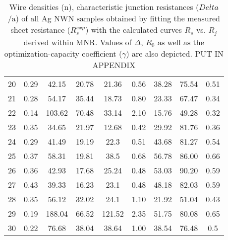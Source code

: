 \begin{table}
\begin{center}
\begin{tabular}{| c | c c c c c c c c |}
20 & 0.29 & 42.15 & 20.78 & 21.36 & 0.56 & 38.28 & 75.54 & 0.51 \\ 
21 & 0.28 & 54.17 & 35.44 & 18.73 & 0.80 & 23.33 & 67.47 & 0.34 \\ 
22 & 0.14 & 103.62 & 70.48 & 33.14 & 2.10 & 15.76 & 49.28 & 0.32 \\ 
23 & 0.35 & 34.65 & 21.97 & 12.68 & 0.42 & 29.92 & 81.76 & 0.36 \\ 
24 & 0.29 & 41.49 & 19.19 & 22.3 & 0.51 & 43.68 & 81.27 & 0.54 \\ 
25 & 0.37 & 58.31 & 19.81 & 38.5 & 0.68 & 56.78 & 86.00 & 0.66 \\ 
26 & 0.36 & 42.93 & 17.68 & 25.24 & 0.48 & 53.03 & 90.20 & 0.59 \\ 
27 & 0.43 & 39.33 & 16.23 & 23.1 & 0.48 & 48.18 & 82.03 & 0.59 \\ 
28 & 0.35 & 56.12 & 32.02 & 24.1 & 1.10 & 21.92 & 51.04 & 0.43 \\ 
29 & 0.19 & 188.04 & 66.52 & 121.52 & 2.35 & 51.75 & 80.08 & 0.65 \\ 
30 & 0.22 & 76.68 & 38.04 & 38.64 & 1.00 & 38.54 & 76.48 & 0.5 \\ 
\hline
\end{tabular}
\caption{\fontsize{12pt}{11pt}\selectfont Wire densities (n), characteristic junction resistances ($Delta$/a) of all Ag NWN samples
obtained by fitting the measured sheet resistance ($R_s^{exp}$) with the calculated curves $R_s$ vs. $R_j$ derived
within MNR. Values of $\Delta$, $R_0$ as well as the optimization-capacity coefficient ($\gamma$) are also depicted. PUT IN APPENDIX}
\label{fig:table}
\end{center}
\end{table}
